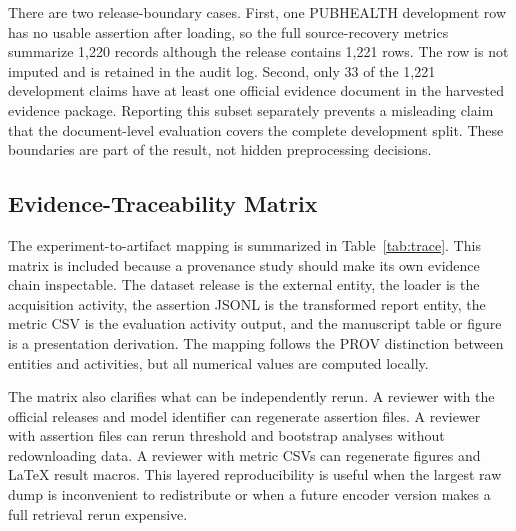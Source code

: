 \documentclass{ieeeaccess}
\begin{document}
There are two release-boundary cases. First, one PUBHEALTH development row has no usable assertion after loading, so the full source-recovery metrics summarize 1,220 records although the release contains 1,221 rows. The row is not imputed and is retained in the audit log. Second, only 33 of the 1,221 development claims have at least one official evidence document in the harvested evidence package. Reporting this subset separately prevents a misleading claim that the document-level evaluation covers the complete development split. These boundaries are part of the result, not hidden preprocessing decisions.

\subsection{Evidence-Traceability Matrix}
The experiment-to-artifact mapping is summarized in Table~\ref{tab:trace}. This matrix is included because a provenance study should make its own evidence chain inspectable. The dataset release is the external entity, the loader is the acquisition activity, the assertion JSONL is the transformed report entity, the metric CSV is the evaluation activity output, and the manuscript table or figure is a presentation derivation. The mapping follows the PROV distinction between entities and activities, but all numerical values are computed locally.

The matrix also clarifies what can be independently rerun. A reviewer with the official releases and model identifier can regenerate assertion files. A reviewer with assertion files can rerun threshold and bootstrap analyses without redownloading data. A reviewer with metric CSVs can regenerate figures and LaTeX result macros. This layered reproducibility is useful when the largest raw dump is inconvenient to redistribute or when a future encoder version makes a full retrieval rerun expensive.
\end{document}
